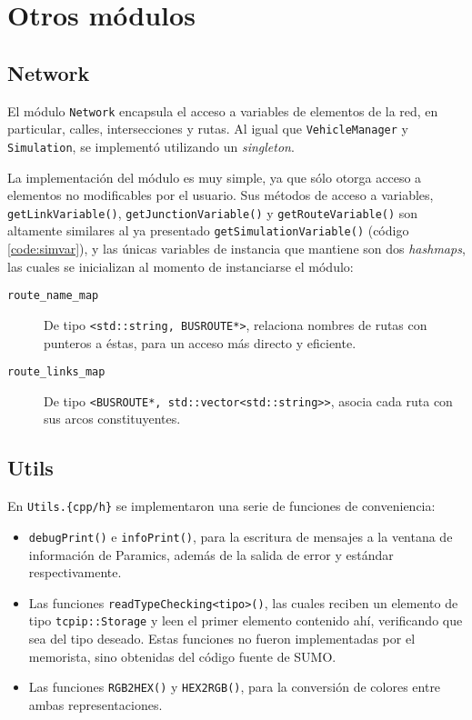\section{Otros módulos}\label{sec:miscmodules}

\subsection{Network}

El módulo \texttt{Network} encapsula el acceso a variables de elementos de la red, en particular, calles, intersecciones y rutas. Al igual que \texttt{VehicleManager} y \texttt{Simulation}, se implementó utilizando un \emph{singleton}. 

La implementación del módulo es muy simple, ya que sólo otorga acceso a elementos no modificables por el usuario. Sus métodos de acceso a variables, \texttt{getLinkVariable()}, \texttt{getJunctionVariable()} y \texttt{getRouteVariable()} son altamente similares al ya presentado \texttt{getSimulationVariable()} (código \ref{code:simvar}), y las únicas variables de instancia que mantiene son dos \emph{hashmaps}, las cuales se inicializan al momento de instanciarse el módulo:
\begin{description}
    \item [\texttt{route\_name\_map}] De tipo \texttt{<std::string, BUSROUTE*>}, relaciona nombres de rutas con punteros a éstas, para un acceso más directo y eficiente.
    
    \item [\texttt{route\_links\_map}] De tipo \texttt{<BUSROUTE*, std::vector<std::string>\@>}, asocia cada ruta con sus arcos constituyentes.
    
\end{description}

 

\subsection{Utils}

En \texttt{Utils.\{cpp/h\}} se implementaron una serie de funciones de conveniencia:
\begin{itemize}
    \item \texttt{debugPrint()} e \texttt{infoPrint()}, para la escritura de mensajes a la ventana de información de Paramics, además de la salida de error y estándar respectivamente. 
    
    \item Las funciones \texttt{readTypeChecking<tipo>()}, las cuales reciben un elemento de tipo \texttt{tcpip::Storage} y leen el primer elemento contenido ahí, verificando que sea del tipo deseado. Estas funciones no fueron implementadas por el memorista, sino obtenidas del código fuente de SUMO.
    
    \item Las funciones \texttt{RGB2HEX()} y \texttt{HEX2RGB()}, para la conversión de colores entre ambas representaciones.
\end{itemize}

